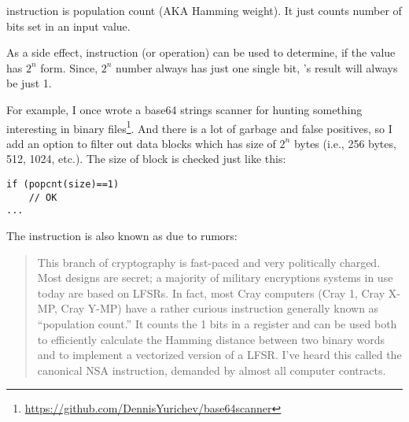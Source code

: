 \label{POPCNT}

 instruction is population count (\ac{AKA} Hamming weight).
It just counts number of bits set in an input value.

As a side effect,  instruction (or operation) can be used to determine, if the value has $2^n$ form.
Since, $2^n$ number always has just one single bit, 's result will always be just 1.

For example, I once wrote a base64 strings scanner for hunting something interesting in binary files\footnote{\url{https://github.com/DennisYurichev/base64scanner}}.
And there is a lot of garbage and false positives, so I add an option to filter out data blocks which has size of $2^n$ bytes
(i.e., 256 bytes, 512, 1024, etc.).
The size of block is checked just like this:

\begin{lstlisting}[style=customc]
if (popcnt(size)==1)
	// OK
...
\end{lstlisting}

The instruction is also known as  due to rumors:

\begin{framed}
\begin{quotation}
  This branch of cryptography is fast-paced and very politically charged.
  Most designs are secret; a majority of military encryptions systems in use today are 
  based on LFSRs. 
  In fact, most Cray computers (Cray 1, Cray X-MP, Cray Y-MP) have a rather curious 
  instruction generally known as “population count.” It counts the 1 bits in a register 
  and can be used both to efficiently calculate the Hamming distance between two binary 
  words and to implement a vectorized version of a LFSR. I’ve heard this called the canonical 
  NSA instruction, demanded by almost all computer contracts.
\end{quotation}
\end{framed}
\InSqBrackets{\Schneier{}}

